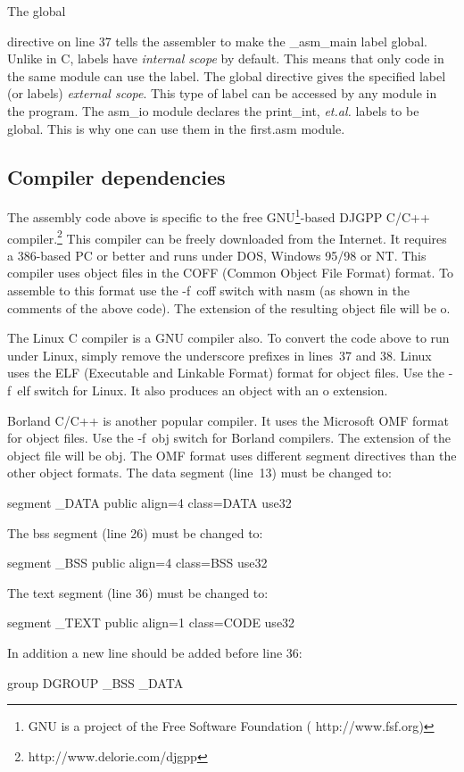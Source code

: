 The {\code global} { directive on line 37
tells the assembler to make the {\code \_asm\_main} label
global. Unlike in C, labels have \emph{internal scope} by
default. This means that only code in the same module can use the
label. The {\code global} directive gives the specified label (or
labels) \emph{external scope}. This type of label can be accessed by
any module in the program. The {\code asm\_io} module declares the
{\code print\_int}, {\em et.al.\/} labels to be global. This is why
one can use them in the {\code first.asm} module.

\subsection{Compiler dependencies}

The assembly code above is specific to the free GNU\footnote{GNU is a
project of the Free Software Foundation ({\code
http://www.fsf.org})}-based DJGPP  C/C++
compiler.\footnote{\code http://www.delorie.com/djgpp} This compiler
can be freely downloaded from the Internet. It requires a 386-based PC
or better and runs under DOS, Windows 95/98 or NT. This compiler uses
object files in the COFF (Common Object File Format) format. To
assemble to this format use the {\code -f~coff} switch with {\code
nasm} (as shown in the comments of the above code). The extension of
the resulting object file will be {\code o}.

The Linux C compiler is a GNU compiler also.  To
convert the code above to run under Linux, simply remove the
underscore prefixes in lines~37 and 38. Linux uses the ELF (Executable
and Linkable Format) format for object files. Use the {\code -f~elf}
switch for Linux. It also produces an object with an {\code o}
extension.

Borland C/C++  is another popular compiler. It
uses the Microsoft OMF format for object files. Use the {\code -f~obj}
switch for Borland compilers. The extension of the object file will be
{\code obj}. The OMF format uses different {\code segment} directives
than the other object formats. The data segment (line~13) must be
changed to:
\begin{CodeQuote}
segment \_DATA public align=4 class=DATA use32
\end{CodeQuote}
The bss segment (line 26) must be changed to:
\begin{CodeQuote}
segment \_BSS public align=4 class=BSS use32
\end{CodeQuote}
The text segment (line 36) must be changed to:
\begin{CodeQuote}
segment \_TEXT public align=1 class=CODE use32
\end{CodeQuote}
In addition a new line should be added before line 36:
\begin{CodeQuote}
group DGROUP \_BSS \_DATA
\end{CodeQuote}

}
